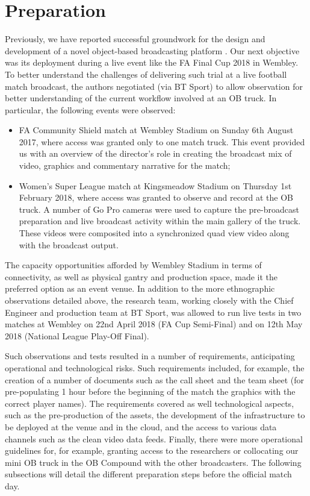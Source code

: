 \documentclass[sigchi-a, authorversion]{acmart}
\begin{document}
\section{Preparation}

Previously, we have reported successful groundwork for the design and development of a novel object-based broadcasting platform \cite{kegel2017, Li:2018_CHI, Li:2018_TVX}. Our next objective was its deployment during a live event like the FA Final Cup 2018 in Wembley. To better understand the challenges of delivering such trial at a live football match broadcast, the authors negotiated (via BT Sport) to allow observation for better understanding of the current workflow involved at an OB truck. In particular, the following events were observed:
\begin{itemize}
  \item FA Community Shield match at Wembley Stadium on Sunday 6th August 2017, where access was granted only to one match truck. This event provided us with an overview of the director's role in creating the broadcast mix of video, graphics and commentary narrative for the match;
  \item Women's Super League match at Kingsmeadow Stadium on Thursday 1st February 2018, where access was granted to observe and record at the OB truck. A number of Go Pro cameras were used to capture the pre-broadcast preparation and live broadcast activity within the main gallery of the truck. These videos were composited into a synchronized quad view video along with the broadcast output.
\end{itemize}

The capacity opportunities afforded by Wembley Stadium in terms of connectivity, as well as physical gantry and production space, made it the preferred option as an event venue. In addition to the more ethnographic observations detailed above, the research team, working closely with the Chief Engineer and production team at BT Sport, was allowed to run live tests in two matches at Wembley on 22nd April 2018 (FA Cup Semi-Final) and on 12th May 2018 (National League Play-Off Final).

Such observations and tests resulted in a number of requirements, anticipating operational and technological risks. Such requirements included, for example, the creation of a number of documents such as the call sheet and the team sheet (for pre-populating 1 hour before the beginning of the match the graphics with the correct player names). The requirements covered as well technological aspects, such as the pre-production of the assets, the development of the infrastructure to be deployed at the venue and in the cloud, and the access to various data channels such as the clean video data feeds. Finally, there were more operational guidelines for, for example, granting access to the researchers or collocating our mini OB truck in the OB Compound with the other broadcasters. The following subsections will detail the different preparation steps before the official match day.
\end{document}
